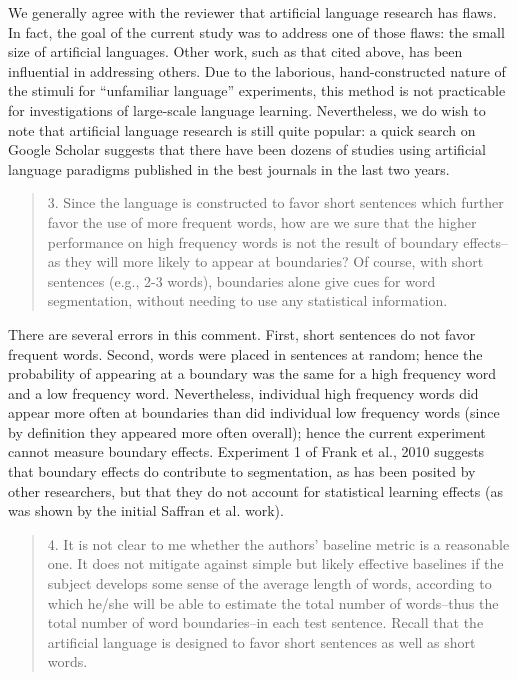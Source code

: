 \documentclass[12pt]{letter}
\begin{document}
We generally agree with the reviewer that artificial language research has flaws. In fact, the goal of the current study was to address one of those flaws: the small size of artificial languages. Other work, such as that cited above, has been influential in addressing others. Due to the laborious, hand-constructed nature of the stimuli for ``unfamiliar language'' experiments, this method is not practicable for investigations of large-scale language learning. Nevertheless, we do wish to note that artificial language research is still quite popular: a quick search on Google Scholar suggests that there have been dozens of studies using artificial language paradigms published in the best journals in the last two years.

\begin{quote}
3. Since the language is constructed to favor short sentences which further favor the use of more frequent words, how are we sure that the higher performance on high frequency words is not the result of boundary effects--as they will more likely to appear at boundaries? Of course, with short sentences (e.g., 2-3 words), boundaries alone give cues for word segmentation, without needing to use any statistical information.
\end{quote}

There are several errors in this comment. First, short sentences do not favor frequent words. Second, words were placed in sentences at random; hence the probability of appearing at a boundary was the same for a high frequency word and a low frequency word. Nevertheless, individual high frequency words did appear more often at boundaries than did individual low frequency words (since by definition they appeared more often overall); hence the current experiment cannot measure boundary effects. Experiment 1 of Frank et al., 2010 suggests that boundary effects do contribute to segmentation, as has been posited by other researchers, but that they do not account for statistical learning effects (as was shown by the initial Saffran et al. work).

\begin{quote}
4. It is not clear to me whether the authors' baseline metric is a reasonable one. It does not mitigate against simple but likely effective baselines if the subject develops some sense of the average length of words, according to which he/she will be able to estimate the total number of words--thus the total number of word boundaries--in each test sentence. Recall that the artificial language is designed to favor short sentences as well as short words. 
\end{quote}
\end{document}
